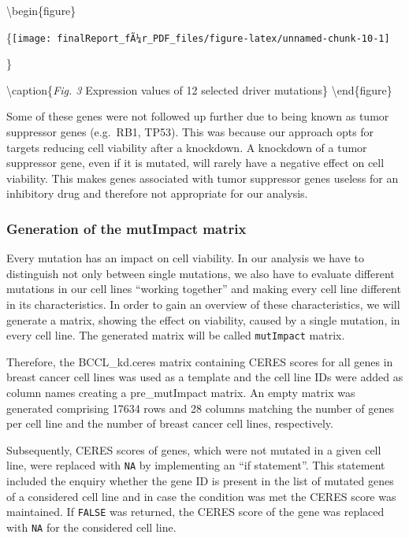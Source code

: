 \documentclass[]{article}
\begin{document}
\textbackslash begin\{figure\}

\{\centering \texttt{[image: finalReport\_fÃ¼r\_PDF\_files/figure-latex/unnamed-chunk-10-1]}

\}

\textbackslash caption\{\emph{Fig. 3} Expression values of 12 selected
driver mutations\}\label{fig:unnamed-chunk-10}
\textbackslash end\{figure\}

Some of these genes were not followed up further due to being known as
tumor suppressor genes (e.g.~RB1, TP53). This was because our approach
opts for targets reducing cell viability after a knockdown. A knockdown
of a tumor suppressor gene, even if it is mutated, will rarely have a
negative effect on cell viability. This makes genes associated with
tumor suppressor genes useless for an inhibitory drug and therefore not
appropriate for our analysis.

\hypertarget{generation-of-the-mutimpact-matrix}{%
\subsubsection{Generation of the mutImpact
matrix}\label{generation-of-the-mutimpact-matrix}}

Every mutation has an impact on cell viability. In our analysis we have
to distinguish not only between single mutations, we also have to
evaluate different mutations in our cell lines ``working together'' and
making every cell line different in its characteristics. In order to
gain an overview of these characteristics, we will generate a matrix,
showing the effect on viability, caused by a single mutation, in every
cell line. The generated matrix will be called \texttt{mutImpact}
matrix.

Therefore, the BCCL\_kd.ceres matrix containing CERES scores for all
genes in breast cancer cell lines was used as a template and the cell
line IDs were added as column names creating a pre\_mutImpact matrix. An
empty matrix was generated comprising 17634 rows and 28 columns matching
the number of genes per cell line and the number of breast cancer cell
lines, respectively.

Subsequently, CERES scores of genes, which were not mutated in a given
cell line, were replaced with \texttt{NA} by implementing an ``if
statement''. This statement included the enquiry whether the gene ID is
present in the list of mutated genes of a considered cell line and in
case the condition was met the CERES score was maintained. If
\texttt{FALSE} was returned, the CERES score of the gene was replaced
with \texttt{NA} for the considered cell line.
\end{document}
